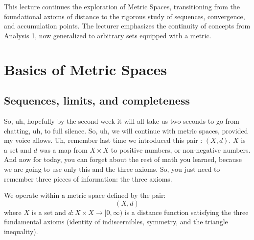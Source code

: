 %


\setcounter{chapter}{8}

\begin{nice-box}[Context]
This lecture continues the exploration of Metric Spaces, transitioning from the foundational axioms of distance to the rigorous study of sequences, convergence, and accumulation points. The lecturer emphasizes the continuity of concepts from Analysis 1, now generalized to arbitrary sets equipped with a metric.
\end{nice-box}

\setcounter{section}{0}
\section{Basics of Metric Spaces}
\setcounter{subsection}{2}
\subsection{Sequences, limits, and completeness}

\begin{spoken-clean}[00:00:00 - 00:00:50]
So, uh, hopefully by the second week it will all take us two seconds to go from chatting, uh, to full silence. So, uh, we will continue with metric spaces, provided my voice allows. Uh, remember last time we introduced this pair : $(X, d)$. $X$ is a set and $d$ was a map from $X \times X$ to positive numbers, or non-negative numbers. And now for today, you can forget about the rest of math you learned, because we are going to use only this and the three axioms. So, you just need to remember three pieces of information: the three axioms.
\end{spoken-clean}

\begin{math-stroke}
We operate within a metric space defined by the pair:
\[ (X, d) \]
where $X$ is a set and $d: X \times X \to [0, \infty)$ is a distance function satisfying the three fundamental axioms (identity of indiscernibles, symmetry, and the triangle inequality).
\end{math-stroke}

